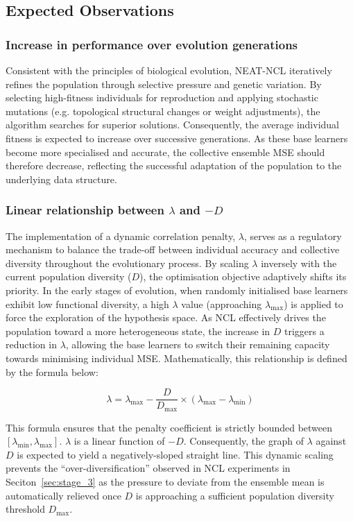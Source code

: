 \documentclass{article}
\begin{document}
\subsection{Expected Observations}


\subsubsection{Increase in performance over evolution generations}
Consistent with the principles of biological evolution, NEAT-NCL iteratively refines the population through selective pressure and genetic variation. By selecting high-fitness individuals for reproduction and applying stochastic mutations (e.g. topological structural changes or weight adjustments), the algorithm searches for superior solutions. Consequently, the average individual fitness is expected to increase over successive generations. As these base learners become more specialised and accurate, the collective ensemble MSE should therefore decrease, reflecting the successful adaptation of the population to the underlying data structure. 


\subsubsection{Linear relationship between $\lambda$ and $-D$}
The implementation of a dynamic correlation penalty, $\lambda$, serves as a regulatory mechanism to balance the trade-off between individual accuracy and collective diversity throughout the evolutionary process. By scaling $\lambda$ inversely with the current population diversity ($D$), the optimisation objective adaptively shifts its priority. In the early stages of evolution, when randomly initialised base learners exhibit low functional diversity, a high $\lambda$ value (approaching $\lambda_{\max}$) is applied to force the exploration of the hypothesis space. As NCL effectively drives the population toward a more heterogeneous state, the increase in $D$ triggers a reduction in $\lambda$, allowing the base learners to switch their remaining capacity towards minimising individual MSE. Mathematically, this relationship is defined by the formula below: 

$$
\lambda = \lambda_{\max} - \frac{D}{D_{\max}} \times (\lambda_{\max} - \lambda_{\min})
$$

This formula ensures that the penalty coefficient is strictly bounded between $[\lambda_{\min}, \lambda_{\max}]$. $\lambda$ is a linear function of $-D$. Consequently, the graph of $\lambda$ against $D$ is expected to yield a negatively-sloped straight line. This dynamic scaling prevents the ``over-diversification'' observed in NCL experiments in Seciton~\ref{sec:stage_3} as the pressure to deviate from the ensemble mean is automatically relieved once $D$ is approaching a sufficient population diversity threshold $D_{\max}$. 
\end{document}

